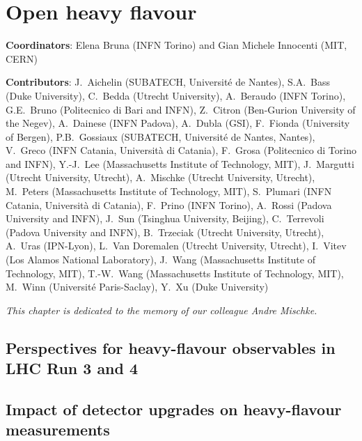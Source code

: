 \documentclass[../report.tex]{subfiles}
\providecommand{\main}{..}
\begin{document}
\clearpage
\section{Open heavy flavour}
\label{sec:HI_HF}

{ \small
\noindent 
\textbf{Coordinators}: Elena Bruna (INFN Torino) and Gian Michele Innocenti (MIT, CERN)

\noindent \textbf{Contributors}: 
J.~Aichelin (SUBATECH, Universit\'e de Nantes),
S.A.~Bass (Duke University),
C.~Bedda (Utrecht University),
A.~Beraudo (INFN Torino),
G.E.~Bruno (Politecnico di Bari and INFN), 
Z.~Citron (Ben-Gurion University of the Negev),
A.~Dainese (INFN Padova),
A.~Dubla (GSI),
F.~Fionda (University of Bergen),
P.B.~Gossiaux (SUBATECH, Universit\'e de Nantes, Nantes),
V.~Greco (INFN Catania, Universit\`a di Catania),
F.~Grosa (Politecnico di Torino and INFN),
Y.-J.~Lee (Massachusetts Institute of Technology, MIT),
J.~Margutti (Utrecht University, Utrecht),
A.~Mischke (Utrecht University, Utrecht),
M.~Peters (Massachusetts Institute of Technology, MIT),
S.~Plumari (INFN Catania, Universit\`a di Catania),
F.~Prino (INFN Torino),
A.~Rossi (Padova University and INFN),
J.~Sun (Tsinghua University, Beijing),
C.~Terrevoli (Padova University and INFN),
B.~Trzeciak (Utrecht University, Utrecht),
A.~Uras (IPN-Lyon),
L.~Van Doremalen (Utrecht University, Utrecht),
I.~Vitev (Los Alamos National Laboratory),
J.~Wang (Massachusetts Institute of Technology, MIT),
T.-W.~Wang (Massachusetts Institute of Technology, MIT),
M.~Winn (Universit\'e Paris-Saclay),
Y.~Xu (Duke University)
}

\vspace{3mm}
\begin{center}
{\em This chapter is dedicated to the memory of our colleague Andre Mischke.}
\end{center}


\subsection{Perspectives for heavy-flavour observables in LHC Run 3 and 4}


\subsection{Impact of detector upgrades on heavy-flavour measurements}

\end{document}
